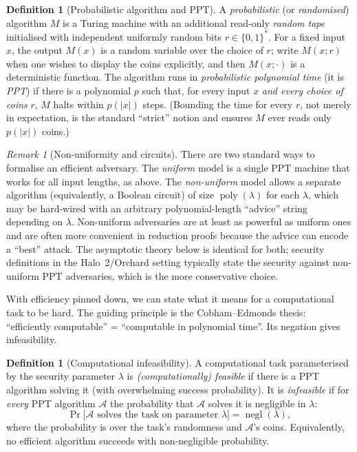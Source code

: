 \documentclass[11pt,a4paper]{article}
\theoremstyle{definition}
\newtheorem{definition}[theorem]{Definition}
\theoremstyle{remark}
\newtheorem{remark}[theorem]{Remark}
\DeclareMathOperator{\negl}{negl}
\DeclareMathOperator{\poly}{poly}
\newcommand{\Adv}{\ensuremath{\mathcal{A}}}
\begin{document}
\begin{definition}[Probabilistic algorithm and PPT]\label{probability:def-ppt}
A \emph{probabilistic} (or \emph{randomised}) algorithm \(M\) is a Turing machine with an additional read-only \emph{random tape} initialised with independent uniformly random bits \(r \in \{0,1\}^*\). For a fixed input \(x\), the output \(M(x)\) is a random variable over the choice of \(r\); write \(M(x; r)\) when one wishes to display the coins explicitly, and then \(M(x;\cdot)\) is a deterministic function. The algorithm runs in \emph{probabilistic polynomial time} (it is \emph{PPT}) if there is a polynomial \(p\) such that, for every input \(x\) \emph{and every choice of coins} \(r\), \(M\) halts within \(p(|x|)\) steps. (Bounding the time for every \(r\), not merely in expectation, is the standard ``strict'' notion and ensures \(M\) ever reads only \(p(|x|)\) coins.)
\end{definition}

\begin{remark}[Non-uniformity and circuits]\label{probability:rem-nonuniform}
There are two standard ways to formalise an efficient adversary. The \emph{uniform} model is a single PPT machine that works for all input lengths, as above. The \emph{non-uniform} model allows a separate algorithm (equivalently, a Boolean circuit) of size \(\poly(\lambda)\) for each \(\lambda\), which may be hard-wired with an arbitrary polynomial-length ``advice'' string depending on \(\lambda\). Non-uniform adversaries are at least as powerful as uniform ones and are often more convenient in reduction proofs because the advice can encode a ``best'' attack. The asymptotic theory below is identical for both; security definitions in the Halo~2/Orchard setting typically state the security against non-uniform PPT adversaries, which is the more conservative choice.
\end{remark}

With efficiency pinned down, we can state what it means for a computational task to be hard. The guiding principle is the Cobham--Edmonds thesis: ``efficiently computable'' = ``computable in polynomial time''. Its negation gives infeasibility.

\begin{definition}[Computational infeasibility]\label{probability:def-infeasible}
A computational task parameterised by the security parameter \(\lambda\) is \emph{(computationally) feasible} if there is a PPT algorithm solving it (with overwhelming success probability). It is \emph{infeasible} if for \emph{every} PPT algorithm \(\Adv\) the probability that \(\Adv\) solves it is negligible in \(\lambda\):
\[
\Pr\big[\Adv \text{ solves the task on parameter } \lambda\big] = \negl(\lambda),
\]
where the probability is over the task's randomness and \(\Adv\)'s coins. Equivalently, no efficient algorithm succeeds with non-negligible probability.
\end{definition}
\end{document}
